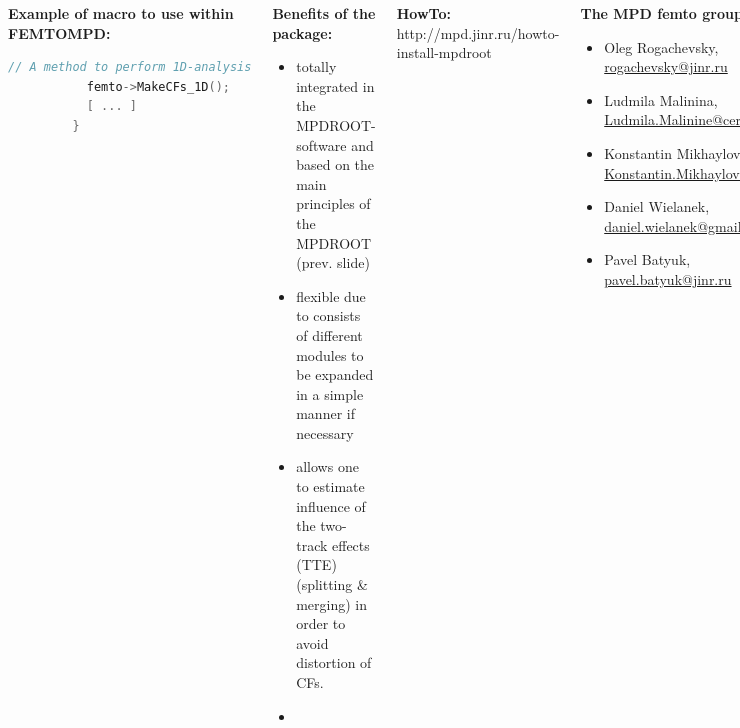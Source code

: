 \documentclass[dvipsnames] {beamer}
\begin{document}
\begin{frame}[fragile, shrink=47]
\begin{columns}[c]
\begin{block}{\bf \centering Example of macro to use within FEMTOMPD:}
\begin{lstlisting}[language=C++,basicstyle=\ttfamily,keywordstyle=\color{red}]
           // A method to perform 1D-analysis
	       femto->MakeCFs_1D();
           [ ... ]
         }
     \end{lstlisting}
   \end{block}
   \begin{block}{\bf \centering Benefits of the package: }
     \begin{itemize}
     \item totally integrated in the MPDROOT-software and based on the main principles of the MPDROOT (prev. slide)
     \item flexible due to consists of different modules to be expanded in a simple manner if necessary
     \item allows one {\color{red} to estimate influence of the two-track effects} (TTE) (splitting \& merging) in order to avoid distortion of CFs.
     \item 
     \end{itemize}
   \end{block}
   \begin{block}{\bf \centering HowTo:}
     http://mpd.jinr.ru/howto-install-mpdroot
   \end{block}
   \begin{block}{\bf \centering The MPD femto group:}
     \begin{itemize}
     \item Oleg Rogachevsky, \url{rogachevsky@jinr.ru}
     \item Ludmila Malinina, \url{Ludmila.Malinine@cern.ch}
     \item Konstantin Mikhaylov, \url{Konstantin.Mikhaylov@cern.ch}
     \item Daniel Wielanek, \url{daniel.wielanek@gmail.com}
     \item Pavel Batyuk, \url{pavel.batyuk@jinr.ru} 
     \end{itemize}
   \end{block}
   \end{columns}
\end{frame}
\end{document}
